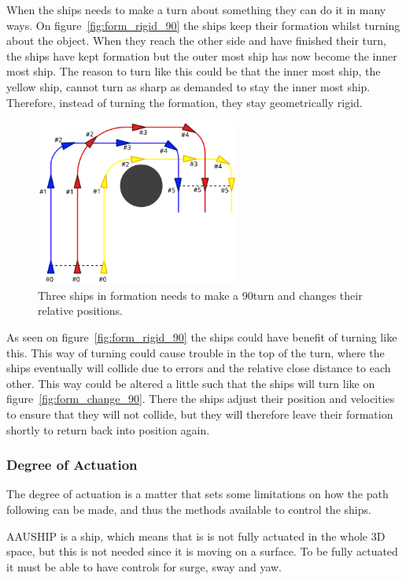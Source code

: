 When the ships needs to make a turn about something they can do it in many ways. On figure~\vref{fig:form_rigid_90} the ships keep their formation whilst turning about the object. When they reach the other side and have finished their turn, the ships have kept formation but the outer most ship has now become the inner most ship. The reason to turn like this could be that the inner most ship, the yellow ship, cannot turn as sharp as demanded to stay the inner most ship. Therefore, instead of turning the formation, they stay geometrically rigid.

\begin{figure}[htbp]
	\centering
	\includegraphics[width=0.6\textwidth]{fig/form_change_90}
	\caption{Three ships in formation needs to make a 90\textdegree turn and changes their relative positions.}
	\label{fig:form_change_90}
\end{figure}

As seen on figure~\vref{fig:form_rigid_90} the ships could have benefit of turning like this. This way of turning could cause trouble in the top of the turn, where the ships eventually will collide due to errors and the relative close distance to each other. This way could be altered a little such that the ships will turn like on figure~\vref{fig:form_change_90}. There the ships adjust their position and velocities to ensure that they will not collide, but they will therefore leave their formation shortly to return back into position again.

\subsubsection{Degree of Actuation}
The degree of actuation is a matter that sets some limitations on how
the path following can be made, and thus the methods available to
control the ships.

AAUSHIP is a ship, which means that is is not fully actuated in the
whole 3D space, but this is not needed since it is moving on a
surface. To be fully actuated it must be able to have controls for
surge, sway and yaw.

